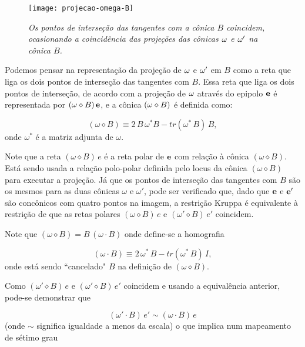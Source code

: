 \begin{figure}[!htb]
\centering
\texttt{[image: projecao-omega-B]}
\caption{\textit{Os pontos de interseção das tangentes com a cônica $B$ coincidem, ocasionando a coincidência das projeções das cônicas ${\bf \omega}$ e ${\bf \omega'}$ na cônica $B$.}}
\label{omega-B}
\end{figure}

Podemos pensar na representação da projeção de  ${\bf \omega}$ e ${\bf \omega'}$ em $B$ como a reta que liga os dois pontos de interseção das tangentes com $B$. Essa reta que liga os dois pontos de interseção, de acordo com a projeção de ${\bf \omega}$ através do epipolo ${\bf e}$ é representada por $({\bf \omega}\diamond B)\,{\bf e}$, e a cônica $({\bf \omega}\diamond B)$ é definida como:

\begin{equation}
(\omega \diamond B)\equiv 2\,B\,\omega^*B - tr(\omega^*\,B)\,B,
\end{equation}
onde $\omega^*$ é a matriz adjunta de $\omega$.

Note que a reta $(\omega \diamond B)\,e$ é a reta polar de ${\bf e}$ com relação à cônica $(\omega \diamond B)$. Está sendo usada a relação polo-polar definida pelo locus da cônica $(\omega \diamond B)$ para executar a projeção. Já que os pontos de interseção das tangentes com $B$ são os mesmos para as duas cônicas $\omega$ e $\omega'$, pode ser verificado que, dado que ${\bf e}$ e ${\bf e'}$ são concônicos com quatro pontos na imagem, a restrição Kruppa é equivalente à restrição de que as retas polares $(\omega \diamond B)\,e$ e $(\omega' \diamond B)\,e'$ coincidem.


Note que $(\omega \diamond B) = B\,(\omega \cdot B)$ onde define-se a homografia

\begin{equation}
(\omega \cdot B) \equiv 2\,\omega^*\,B - tr(\omega^*\,B)\,I,
\end{equation}
onde está sendo ``cancelado" $B$ na definição de $(\omega \diamond B)$. 


Como $(\omega' \diamond B)\,e$ e $(\omega' \diamond B)\,e'$ coincidem e usando a equivalência anterior, pode-se demonstrar que 

\begin{equation}
(\omega' \cdot B)\,e' \sim (\omega \cdot B)\,e
\end{equation} 
(onde $\sim$ significa igualdade a menos da escala) o que implica num mapeamento de sétimo grau 

